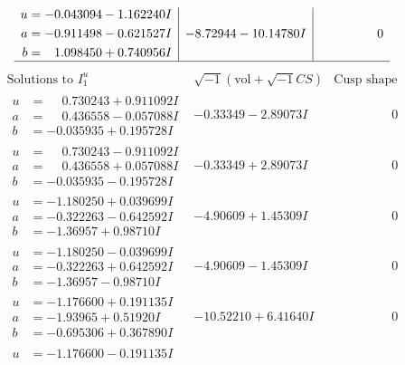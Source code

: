 \documentclass[1p]{elsarticle_modified}
\theoremstyle{definition}
\newcommand{\I}{\sqrt{-1}}
\begin{document}
$$\begin{array}{c|c|c}
\begin{aligned}
u &= -0.043094 - 1.162240 I \\
a &= -0.911498 - 0.621527 I \\
b &= \phantom{-}1.098450 + 0.740956 I\end{aligned}
 & -8.72944 - 10.14780 I & \phantom{-0.000000 } 0\\
 \hline 
 \end{array}$$\newpage$$\begin{array}{c|c|c}  
\text{Solutions to }I^u_{1}& \I (\text{vol} + \sqrt{-1}CS) & \text{Cusp shape}\\
 \hline 
\begin{aligned}
u &= \phantom{-}0.730243 + 0.911092 I \\
a &= \phantom{-}0.436558 - 0.057088 I \\
b &= -0.035935 + 0.195728 I\end{aligned}
 & -0.33349 - 2.89073 I & \phantom{-0.000000 } 0 \\ \hline\begin{aligned}
u &= \phantom{-}0.730243 - 0.911092 I \\
a &= \phantom{-}0.436558 + 0.057088 I \\
b &= -0.035935 - 0.195728 I\end{aligned}
 & -0.33349 + 2.89073 I & \phantom{-0.000000 } 0 \\ \hline\begin{aligned}
u &= -1.180250 + 0.039699 I \\
a &= -0.322263 - 0.642592 I \\
b &= -1.36957 + 0.98710 I\end{aligned}
 & -4.90609 + 1.45309 I & \phantom{-0.000000 } 0 \\ \hline\begin{aligned}
u &= -1.180250 - 0.039699 I \\
a &= -0.322263 + 0.642592 I \\
b &= -1.36957 - 0.98710 I\end{aligned}
 & -4.90609 - 1.45309 I & \phantom{-0.000000 } 0 \\ \hline\begin{aligned}
u &= -1.176600 + 0.191135 I \\
a &= -1.93965 + 0.51920 I \\
b &= -0.695306 + 0.367890 I\end{aligned}
 & -10.52210 + 6.41640 I & \phantom{-0.000000 } 0 \\ \hline\begin{aligned}
u &= -1.176600 - 0.191135 I \\

\end{aligned}
\end{array}$$
\end{document}
